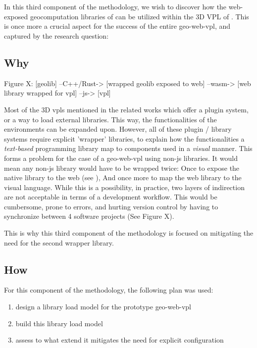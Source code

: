 
\section{\mySubRQThreeTitle} 
\label{sec:method-three}
In this third component of the methodology, we wish to discover how the web-exposed geocomputation libraries of  can be utilized within the 3D VPL of . 
This is once more a crucial aspect for the success of the entire \ac*{geo-web-vpl}, 
and captured by the research question: \mySubRQThree


\subsection{Why}

\begin{note}
Figure X: [geolib] --C++/Rust-> [wrapped geolib exposed to web] --wasm-> [web library wrapped for vpl] --js-> [vpl]
\end{note}

Most of the 3D vpls mentioned in the related works which offer a plugin system, or a way to load external libraries.
This way, the functionalities of the environments can be expanded upon.
However, all of these plugin / library systems require explicit 'wrapper' libraries, to explain how the functionalities a \emph{text-based} programming library map to components used in a \emph{visual} manner.
This forms a problem for the case of a \ac{geo-web-vpl} using non-js libraries. 
It would mean any non-js library would have to be wrapped twice: 
Once to expose the native library to the web (see ),
And once more to map the web library to the visual language. 
While this is a possibility, in practice, two layers of indirection are not acceptable in terms of a development workflow.
This would be cumbersome, prone to errors, and hurting version control by having to synchronize between 4 software projects (See Figure X). 

This is why this third component of the methodology is focused on mitigating the need for the second wrapper library. 

\subsection{How}
For this component of the methodology, the following plan was used: 
\begin{enumerate}[-]
  \item design a library load model for the prototype \ac*{geo-web-vpl}
  \item build this library load model 
  \item assess to what extend it mitigates the need for explicit configuration
\end{enumerate}

